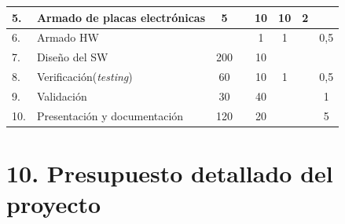 \documentclass[11pt]{charter}
\begin{document}
\begin{table}[htpb]
{\begin{tabularx}{\linewidth}{@{}|p{1.5em}|X|c|c|c|c|c|c|@{}}
5.& Armado de placas electrónicas  & \cellcolor[HTML]{EFF7FF}5&\cellcolor[HTML]{F5F3D7}& \cellcolor[HTML]{FFFFDD}10&\cellcolor[HTML]{EFF7FF}10&
\cellcolor[HTML]{F5F3D7}2&\cellcolor[HTML]{FFFFDD}
\\ \hline

6.& Armado HW & \cellcolor[HTML]{EFF7FF}&\cellcolor[HTML]{F5F3D7}& \cellcolor[HTML]{FFFFDD}1&\cellcolor[HTML]{EFF7FF}1&
\cellcolor[HTML]{F5F3D7}&\cellcolor[HTML]{FFFFDD}0,5
\\ \hline

7.& Diseño del SW  & \cellcolor[HTML]{EFF7FF}200&\cellcolor[HTML]{F5F3D7}& \cellcolor[HTML]{FFFFDD}10&\cellcolor[HTML]{EFF7FF}&
\cellcolor[HTML]{F5F3D7}&\cellcolor[HTML]{FFFFDD}
\\ \hline

8.& Verificación(\textit{testing})& \cellcolor[HTML]{EFF7FF}60&\cellcolor[HTML]{F5F3D7}& \cellcolor[HTML]{FFFFDD}10&\cellcolor[HTML]{EFF7FF}1&
\cellcolor[HTML]{F5F3D7}&\cellcolor[HTML]{FFFFDD}0,5
\\ \hline

9.& Validación  & \cellcolor[HTML]{EFF7FF}30&\cellcolor[HTML]{F5F3D7}& \cellcolor[HTML]{FFFFDD}40&\cellcolor[HTML]{EFF7FF}&
\cellcolor[HTML]{F5F3D7}&\cellcolor[HTML]{FFFFDD}1
\\ \hline

10.& Presentación y documentación  & \cellcolor[HTML]{EFF7FF}120&\cellcolor[HTML]{F5F3D7}& \cellcolor[HTML]{FFFFDD}20&\cellcolor[HTML]{EFF7FF}&
\cellcolor[HTML]{F5F3D7}&\cellcolor[HTML]{FFFFDD}5
\\ \hline
\end{tabularx}
}
\end{table}



\section{10. Presupuesto detallado del proyecto}
\label{sec:presupuesto}

\end{document}
